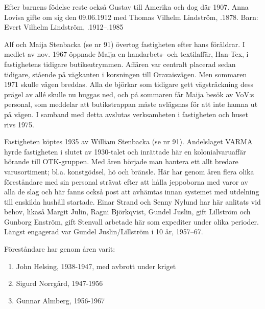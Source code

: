 Efter barnens födelse reste också Gustav till Amerika och dog där 1907. Anna Lovisa gifte om sig den 09.06.1912 med Thomas Vilhelm Lindström, .1878.
Barn: Evert Vilhelm Lindström, .1912--.1985



%



%
Alf och Maija Stenbacka (se nr 91) övertog fastigheten efter hans föräldrar. I medlet av nov. 1967 öppnade Maija en handarbets- och textilaffär, Han-Tex, i fastighetens tidigare butiksutrymmen. Affären var centralt placerad sedan tidigare, stående på vägkanten i korsningen till Oravaisvägen. Men sommaren 1971 skulle vägen breddas. Alla de björkar som tidigare gett vägsträckning dess prägel av allé skulle nu huggas ned, och på sommaren får Maija besök av VoV:s personal, som meddelar att butikstrappan måste avlägsnas för att inte hamna ut på vägen. I samband med detta avslutas verksamheten i fastigheten och huset rivs 1975.


%
Fastigheten köptes 1935 av William Stenbacka (se nr 91). Andelslaget VARMA hyrde fastigheten i slutet av 1930-talet och inrättade här en kolonialvaruaffär hörande till OTK-gruppen. Med åren började man hantera ett allt bredare varusortiment; bl.a. konstgödsel, hö och bränsle. Här har genom åren flera  olika föreståndare med sin personal strävat efter att hålla jeppoborna med varor av alla de slag och här fanns också post att avhämtas innan systemet med utdelning till enskilda hushåll startade. Einar Strand och Senny Nylund har här anlitats vid behov, likaså Margit Julin, Ragni Björkqvist, Gundel Juslin, gift Lillström och Gunborg Enström, gift Stenvall arbetade här som expediter under olika perioder. Längst engagerad var Gundel Juslin/Lillström i 10 år, 1957--67.

Föreståndare har genom åren varit:
\begin{enumerate}
  \item John Helsing, 1938-1947, med avbrott under kriget
  \item Sigurd Norrgård, 1947-1956
  \item Gunnar Almberg, 1956-1967
\end{enumerate}

